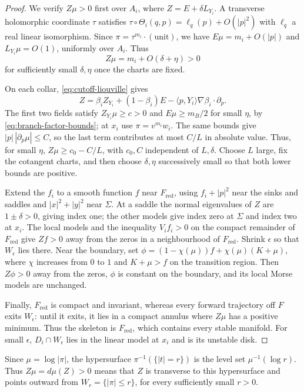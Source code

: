 \documentclass[a4paper]{amsart}
\numberwithin{equation}{section}
\begin{document}
\begin{proof}
We verify $Z\mu>0$ first over $A_i$, where $Z=E+\delta L_{Y_i}$.
A transverse holomorphic coordinate $\tau$ satisfies
$\tau\circ\Theta_i(q,p)=\ell_q(p)+O(|p|^2)$ with $\ell_q$ a real
linear isomorphism. Since $\pi=\tau^{m_i}\cdot(\text{unit})$, we have
$E\mu=m_i+O(|p|)$ and $L_{Y_i}\mu=O(1)$, uniformly over $A_i$.
Thus
\[
 Z\mu=m_i+O(\delta+\eta)>0
\]
for sufficiently small $\delta,\eta$ once the charts are fixed.

On each collar,
\eqref{eq:cutoff-liouville} gives
\[
 Z=\beta_i Z_{Y_i}+(1-\beta_i)E
   -\langle p,Y_i\rangle\nabla\beta_i\cdot\partial_p .
\]
The first two fields satisfy $Z_{Y_i}\mu\ge c>0$ and
$E\mu\ge m_B/2$ for small $\eta$, by
\eqref{eq:branch-factor-bounds}; at $x_i$ use
$\pi=v^{m_i}w_i$. The same bounds give
$|p|\,|\partial_p\mu|\le C$, so the last term contributes at most
$C/L$ in absolute value. Thus, for small $\eta$,
$Z\mu\ge c_0-C/L$, with $c_0,C$ independent of $L,\delta$.
Choose $L$ large, fix the
cotangent charts, and then choose $\delta,\eta$ successively small
so that both lower bounds are positive.

Extend the $f_i$ to a smooth function $f$ near $F_{\mathrm{red}}$,
using $f_i+|p|^2$ near the sinks and saddles and $|x|^2+|y|^2$ near
$\Sigma$. At a saddle the normal eigenvalues of $Z$ are $1\pm\delta>0$,
giving index one; the other models give index zero at $\Sigma$ and
index two at $x_i$.
The local models and the inequality $V_if_i>0$ on the compact
remainder of $F_{\mathrm{red}}$ give $Zf>0$ away from the zeros in
a neighbourhood of $F_{\mathrm{red}}$. Shrink $\epsilon$ so that $W_\epsilon$ lies there.
Near the boundary, set
$\phi=(1-\chi(\mu))f+\chi(\mu)(K+\mu)$, where $\chi$ increases
from $0$ to $1$ and $K+\mu>f$ on the transition region. Then
$Z\phi>0$ away from the zeros, $\phi$ is constant on the boundary,
and its local Morse models are unchanged.

Finally, $F_{\mathrm{red}}$ is compact and invariant, whereas every
forward trajectory off $F$ exits $W_\epsilon$: until it exits, it
lies in a compact annulus where $Z\mu$ has a positive minimum.
Thus the skeleton is $F_{\mathrm{red}}$, which contains every stable
manifold. For small $\epsilon$, $D_i\cap W_\epsilon$ lies in the
linear model at $x_i$ and is its unstable disk.
\end{proof}

\begin{remark}
Since $\mu=\log|\pi|$, the hypersurface
$\pi^{-1}(\{|t|=r\})$ is the level set $\mu^{-1}(\log r)$.
Thus $Z\mu=d\mu(Z)>0$ means that $Z$ is transverse to this
hypersurface and points outward from $W_r=\{|\pi|\le r\}$,
for every sufficiently small $r>0$.
\end{remark}
\end{document}

